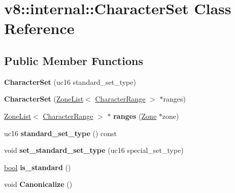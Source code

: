 \hypertarget{classv8_1_1internal_1_1CharacterSet}{}\section{v8\+:\+:internal\+:\+:Character\+Set Class Reference}
\label{classv8_1_1internal_1_1CharacterSet}
\subsection*{Public Member Functions}
\begin{DoxyCompactItemize}
\item 
\mbox{\label{classv8_1_1internal_1_1CharacterSet_af8489cf347f180b513470f3c534e5b29}} 
{\bfseries Character\+Set} (uc16 standard\+\_\+set\+\_\+type)
\item 
\mbox{\label{classv8_1_1internal_1_1CharacterSet_aa23830fe738f96027f2aa6f5fbabef5d}} 
{\bfseries Character\+Set} (\mbox{\hyperlink{classv8_1_1internal_1_1ZoneList}{Zone\+List}}$<$ \mbox{\hyperlink{classv8_1_1internal_1_1CharacterRange}{Character\+Range}} $>$ $\ast$ranges)
\item 
\mbox{\label{classv8_1_1internal_1_1CharacterSet_af3cb78cf3902be5f28a654a9659af385}} 
\mbox{\hyperlink{classv8_1_1internal_1_1ZoneList}{Zone\+List}}$<$ \mbox{\hyperlink{classv8_1_1internal_1_1CharacterRange}{Character\+Range}} $>$ $\ast$ {\bfseries ranges} (\mbox{\hyperlink{classv8_1_1internal_1_1Zone}{Zone}} $\ast$zone)
\item 
\mbox{\label{classv8_1_1internal_1_1CharacterSet_a9e553f2a52bcd069861ee92728493103}} 
uc16 {\bfseries standard\+\_\+set\+\_\+type} () const
\item 
\mbox{\label{classv8_1_1internal_1_1CharacterSet_aaf26d47684537c40d06e78cb4900b4df}} 
void {\bfseries set\+\_\+standard\+\_\+set\+\_\+type} (uc16 special\+\_\+set\+\_\+type)
\item 
\mbox{\label{classv8_1_1internal_1_1CharacterSet_af85d4fa20c252150f0dc9006288ea727}} 
\mbox{\hyperlink{classbool}{bool}} {\bfseries is\+\_\+standard} ()
\item 
\mbox{\label{classv8_1_1internal_1_1CharacterSet_a64d63da241ba39d8e9c6bdfc06c6b81e}} 
void {\bfseries Canonicalize} ()
\end{DoxyCompactItemize}


